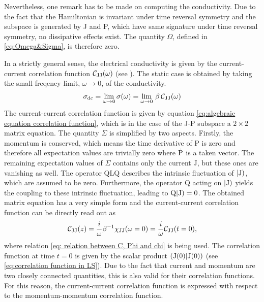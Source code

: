 Nevertheless, one remark has to be made on computing the conductivity.
Due to the fact that the Hamiltonian is invariant under time reversal symmetry and the subspace is generated by J and P, which have same signature under time reversal symmetry, no dissipative effects exist.
The quantity $\Omega$, defined in \eqref{eq:Omega&Sigma}, is therefore zero.

In a strictly general sense, the electrical conductivity is given by the current-current correlation function $\mathcal{C}_{\mathrm{JJ}}(\omega)$ (see \cite{Chycholl2}).
The static case is obtained by taking the small freqency limit, $\omega \to 0$, of the conductivity.
%
\begin{align}
	\sigma_{\mathrm{dc}} = \lim\limits_{\omega \to 0} \sigma(\omega) = \lim\limits_{\omega \to 0}\, \beta\,\mathcal{C}_{\mathrm{JJ}}(\omega)
	\label{eq:general static condictivity}
\end{align}
%
The current-current correlation function is given by equation \eqref{eq:algebraic equation correlation function}, which is in the case of the J-P subspace a $2\times2$ matrix equation.
The quantity $\Sigma$ is simplified by two aspects.
Firstly, the momentum is conserved, which means the time derivative of P is zero and therefore all expectation values are trivially zero where $\dot{\mathrm{P}}$ is a taken vector.
The remaining expectation values of $\Sigma$ contains only the current J, but these ones are vanishing as well.
The operator QLQ describes the intrinsic fluctuation of $|\mathrm{\mathrm{J}})$, which are assumed to be zero.
Furthermore, the operator Q acting on $|\mathrm{\mathrm{J}})$ yields the coupling to these intrinsic fluctuation, leading to $\mathrm{Q}|\mathrm{\mathrm{J}}) = 0$.
The obtained matrix equation has a very simple form and the current-current correlation function can be directly read out as
%
\begin{align}
	\mathcal{C}_{\mathrm{JJ}}(z) = \frac{i}{\omega} \beta^{-1} \chi_{\mathrm{JJ}}(\omega=0) = \frac{i}{\omega} \mathcal{C}_{\mathrm{JJ}}(t=0),
	\label{eq:correlation function unpertubated system}
\end{align}
%
where relation \eqref{eq: relation between C, Phi and chi} is being used.
The correlation function at time $t = 0$ is given by the scalar product $({\mathrm{J}(0)}|{\mathrm{J}(0)})$ (see \eqref{eq:correlation function in LS}).
Due to the fact that current and momentum are two closely connected quantities, this is also valid for their correlation functions.
For this reason, the current-current correlation function is expressed with respect to the momentum-momentum correlation function.

